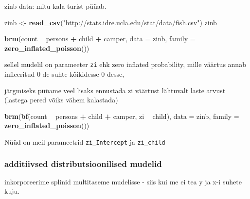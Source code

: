 \documentclass[]{article}
\newenvironment{Shaded}{\begin{snugshade}}{\end{snugshade}}
\newcommand{\KeywordTok}[1]{\textcolor[rgb]{0.13,0.29,0.53}{\textbf{#1}}}
\newcommand{\DataTypeTok}[1]{\textcolor[rgb]{0.13,0.29,0.53}{#1}}
\newcommand{\StringTok}[1]{\textcolor[rgb]{0.31,0.60,0.02}{#1}}
\newcommand{\OperatorTok}[1]{\textcolor[rgb]{0.81,0.36,0.00}{\textbf{#1}}}
\newcommand{\NormalTok}[1]{#1}
\begin{document}
zinb data: mitu kala turist püüab.

\begin{Shaded}
\begin{Highlighting}[]
\NormalTok{zinb <-}\StringTok{ }\KeywordTok{read_csv}\NormalTok{(}\StringTok{"http://stats.idre.ucla.edu/stat/data/fish.csv"}\NormalTok{)}
\NormalTok{zinb}
\end{Highlighting}
\end{Shaded}

\begin{Shaded}
\begin{Highlighting}[]
\KeywordTok{brm}\NormalTok{(count }\OperatorTok{~}\StringTok{ }\NormalTok{persons }\OperatorTok{+}\StringTok{ }\NormalTok{child }\OperatorTok{+}\StringTok{ }\NormalTok{camper, }
                 \DataTypeTok{data =}\NormalTok{ zinb, }\DataTypeTok{family =} \KeywordTok{zero_inflated_poisson}\NormalTok{())}
\end{Highlighting}
\end{Shaded}

sellel mudelil on parameeter \texttt{zi} ehk zero inflated probability,
mille väärtus annab infleeritud 0-de suhte kõikidesse 0-desse,

järgmiseks püüame veel lisaks ennustada zi väärtust lähtuvalt laste
arvust (lastega pered võiks vähem kalastada)

\begin{Shaded}
\begin{Highlighting}[]
\KeywordTok{brm}\NormalTok{(}\KeywordTok{bf}\NormalTok{(count }\OperatorTok{~}\StringTok{ }\NormalTok{persons }\OperatorTok{+}\StringTok{ }\NormalTok{child }\OperatorTok{+}\StringTok{ }\NormalTok{camper, }
\NormalTok{       zi }\OperatorTok{~}\StringTok{ }\NormalTok{child), }\DataTypeTok{data =}\NormalTok{ zinb, }\DataTypeTok{family =} \KeywordTok{zero_inflated_poisson}\NormalTok{())}
\end{Highlighting}
\end{Shaded}

Nüüd on meil parameetrid \texttt{zi\_Intercept} ja \texttt{zi\_child}

\subsubsection{additiivsed distributsioonilised
mudelid}\label{additiivsed-distributsioonilised-mudelid}

inkorporeerime splinid multitaseme mudelisse - siis kui me ei tea y ja
x-i suhete kuju.
\end{document}
